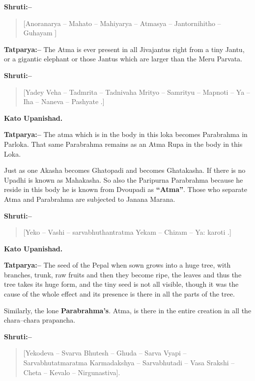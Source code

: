 \textbf{Shruti:–}

\begin{verse}
[Anoranarya – Mahato – Mahiyarya – Atmasya – Jantornihitho – Guhayam ]
\end{verse}

\textbf{Tatparya:–} The Atma is ever present in all Jivajantus right from a tiny Jantu, or a gigantic elephant or those Jantus which are larger than the Meru Parvata.

\textbf{Shruti:–}

\begin{verse}
[Yadey Veha – Tadmrita – Tadnivaha Mrityo – Samrityu – Mapnoti – Ya – Iha – Naneva – Pashyate .]
\end{verse}

\begin{flushright}
\textbf{Kato Upanishad.}
\end{flushright}

\textbf{Tatparya:–} The atma which is in the body in this loka becomes Parabrahma in Parloka. That same Parabrahma remains as an Atma Rupa in the body in this Loka.

Just as one Akasha becomes Ghatopadi and becomes Ghatakasha. If there is no Upadhi is known as Mahakasha. So also the Paripurna Parabrahma because he reside in this body he is known from Dvoupadi as \textbf{“Atma”}. Those who separate Atma and Parabrahma are subjected to Janana Marana.

\textbf{Shruti:–}

\begin{verse}
[Yeko – Vashi – sarvabhuthantratma Yekam – Chizam – Ya: karoti .]
\end{verse}

\begin{flushright}
\textbf{Kato Upanishad.}
\end{flushright}

\textbf{Tatparya:–} The seed of the Pepal when sown grows into a huge tree, with branches, trunk, raw fruits and then they become ripe, the leaves and thus the tree takes its huge form, and the tiny seed is not all visible, though it was the cause of the whole effect and its presence is there in all the parts of the tree.

Similarly, the lone \textbf{Parabrahma's}. Atma, is there in the entire creation in all the chara–chara prapancha.

\textbf{Shruti:–}

\begin{verse}
[Yekodeva – Svarva Bhutesh – Ghuda – Sarva Vyapi – Sarvabhutatmaratma  Karmadakshya – Sarvabhutadi – Vasa Srakshi – Cheta – Kevalo – Nirgunastiva].
\end{verse}

